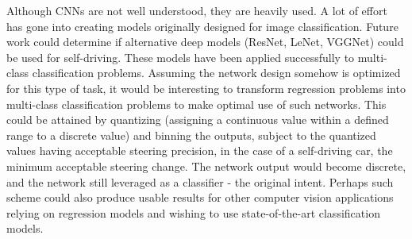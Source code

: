 Although CNNs are not well understood, they are heavily used. A lot of effort has gone into creating models originally designed for image classification. Future work could determine if alternative deep models (ResNet, LeNet, VGGNet) could be used for self-driving. These models have been applied successfully to multi-class classification problems. Assuming the network design somehow is optimized for this type of task, it would be interesting to transform regression problems into multi-class classification problems to make optimal use of such networks. This could be attained by quantizing (assigning a continuous value within a defined range to a discrete value) and binning the outputs, subject to the quantized values having acceptable steering precision, in the case of a self-driving car, the minimum acceptable steering change. The network output would become discrete, and the network still leveraged as a classifier - the original intent. Perhaps such scheme could also produce usable results for other computer vision applications relying on regression models and wishing to use state-of-the-art classification models.


